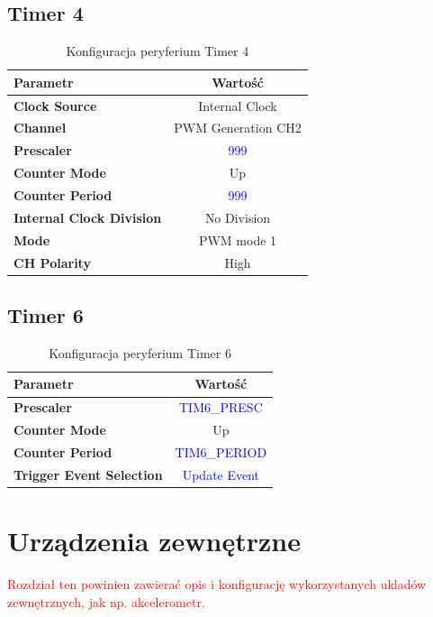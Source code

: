 \documentclass[10pt, a4paper]{article}
\begin{document}
\subsection{Timer 4}

\begin{table}[H]
	\centering
	\begin{tabular}{|l|c|} \hline
		\textbf{Parametr} & Wartość \\
		\hline
		\hline  \textbf{Clock Source}&Internal Clock  \\\hline
		\textbf{Channel} & PWM Generation CH2\\\hline
		\textbf{Prescaler} & \textcolor{blue}{999}\\\hline
		\textbf{Counter Mode} &  Up\\
		\hline
		\textbf{Counter Period}& \textcolor{blue}{999}\\\hline
		\textbf{Internal Clock Division}& No Division\\
		\hline
		\textbf{Mode}& PWM mode 1\\
		\hline
		\textbf{CH Polarity}& High\\
		\hline
	\end{tabular}
	\caption{Konfiguracja peryferium Timer 4}
	\label{tab:Timer4}
\end{table}

\subsection{Timer 6}

\begin{table}[H]
	\centering
	\begin{tabular}{|l|c|} \hline
		\textbf{Parametr} & Wartość \\
		\hline
		\hline
		\textbf{Prescaler} & \textcolor{blue}{TIM6\_PRESC}\\\hline
		\textbf{Counter Mode} &  Up\\
		\hline
		\textbf{Counter Period}& \textcolor{blue}{TIM6\_PERIOD}\\\hline
		\textbf{Trigger Event Selection}& \textcolor{blue}{Update Event}\\
		\hline
	\end{tabular}
	\caption{Konfiguracja peryferium Timer 6}
	\label{tab:Timer6}
\end{table}
\section{Urządzenia zewnętrzne}
\textcolor{red}{Rozdział ten powinien zawierać opis i konfigurację wykorzystanych ukladów
	zewnętrznych, jak np. akcelerometr.}
\end{document}
